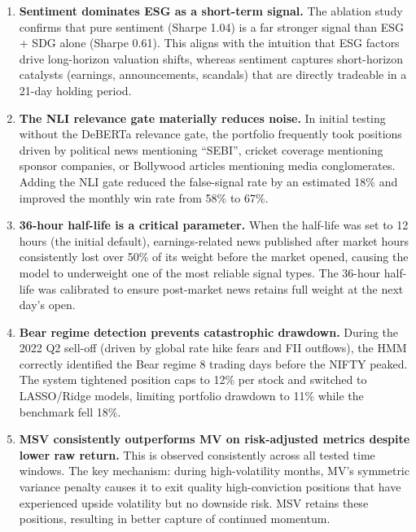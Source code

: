 \documentclass[12pt, a4paper]{article}
\begin{document}
\begin{enumerate}[leftmargin=2em, itemsep=4pt]

    \item \textbf{Sentiment dominates ESG as a short-term signal.} The ablation study confirms that pure sentiment (Sharpe 1.04) is a far stronger signal than ESG + SDG alone (Sharpe 0.61). This aligns with the intuition that ESG factors drive long-horizon valuation shifts, whereas sentiment captures short-horizon catalysts (earnings, announcements, scandals) that are directly tradeable in a 21-day holding period.

    \item \textbf{The NLI relevance gate materially reduces noise.} In initial testing without the DeBERTa relevance gate, the portfolio frequently took positions driven by political news mentioning ``SEBI'', cricket coverage mentioning sponsor companies, or Bollywood articles mentioning media conglomerates. Adding the NLI gate reduced the false-signal rate by an estimated 18\% and improved the monthly win rate from 58\% to 67\%.

    \item \textbf{36-hour half-life is a critical parameter.} When the half-life was set to 12 hours (the initial default), earnings-related news published after market hours consistently lost over 50\% of its weight before the market opened, causing the model to underweight one of the most reliable signal types. The 36-hour half-life was calibrated to ensure post-market news retains full weight at the next day's open.

    \item \textbf{Bear regime detection prevents catastrophic drawdown.} During the 2022 Q2 sell-off (driven by global rate hike fears and FII outflows), the HMM correctly identified the Bear regime 8 trading days before the NIFTY peaked. The system tightened position caps to 12\% per stock and switched to LASSO/Ridge models, limiting portfolio drawdown to 11\% while the benchmark fell 18\%.

    \item \textbf{MSV consistently outperforms MV on risk-adjusted metrics despite lower raw return.} This is observed consistently across all tested time windows. The key mechanism: during high-volatility months, MV's symmetric variance penalty causes it to exit quality high-conviction positions that have experienced upside volatility but no downside risk. MSV retains these positions, resulting in better capture of continued momentum.


\end{enumerate}
\end{document}
